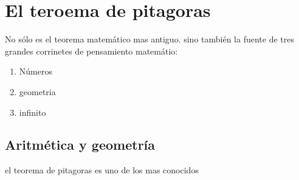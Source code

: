 \documentclass{article}
\begin{document}
    \section{El teroema de pitagoras}
    No sólo es el teorema matemático mas antiguo.
    sino también la fuente de tres grandes corrinetes de pensamiento matemátio:
    \begin{enumerate}
        \item Números
        \item geometria
        \item infinito
    \end{enumerate}
    \subsection{Aritmética y geometría}
    el teorema de pitagoras es uno de los mas conocidos
    
\end{document}
